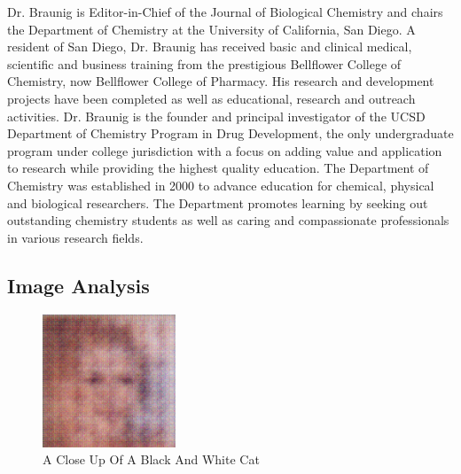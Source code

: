 \documentclass{article}%
\begin{document}
Dr. Braunig is Editor{-}in{-}Chief of the Journal of Biological Chemistry and chairs the Department of Chemistry at the University of California, San Diego. A resident of San Diego, Dr. Braunig has received basic and clinical medical, scientific and business training from the prestigious Bellflower College of Chemistry, now Bellflower College of Pharmacy. His research and development projects have been completed as well as educational, research and outreach activities. Dr. Braunig is the founder and principal investigator of the UCSD Department of Chemistry Program in Drug Development, the only undergraduate program under college jurisdiction with a focus on adding value and application to research while providing the highest quality education. The Department of Chemistry was established in 2000 to advance education for chemical, physical and biological researchers. The Department promotes learning by seeking out outstanding chemistry students as well as caring and compassionate professionals in various research fields.

%
\subsection{Image Analysis}%
\label{subsec:ImageAnalysis}%


\begin{figure}[h!]%
\centering%
\includegraphics[width=150px]{500_fake_images/samples_5_121.png}%
\caption{A Close Up Of A Black And White Cat}%
\end{figure}

%
\end{document}
